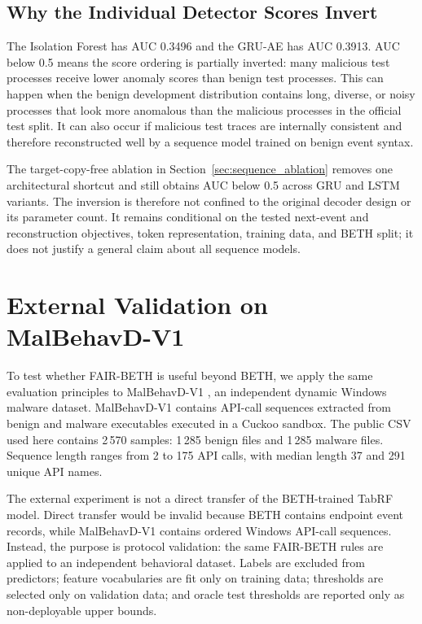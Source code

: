 \documentclass[10pt,journal,compsoc]{IEEEtran}
\begin{document}
\subsection{Why the Individual Detector Scores Invert}

The Isolation Forest has AUC 0.3496 and the GRU-AE has AUC 0.3913. AUC below 0.5 means the score ordering is partially inverted: many malicious test processes receive lower anomaly scores than benign test processes. This can happen when the benign development distribution contains long, diverse, or noisy processes that look more anomalous than the malicious processes in the official test split. It can also occur if malicious test traces are internally consistent and therefore reconstructed well by a sequence model trained on benign event syntax.

The target-copy-free ablation in Section~\ref{sec:sequence_ablation} removes one architectural shortcut and still obtains AUC below 0.5 across GRU and LSTM variants. The inversion is therefore not confined to the original decoder design or its parameter count. It remains conditional on the tested next-event and reconstruction objectives, token representation, training data, and BETH split; it does not justify a general claim about all sequence models.

\section{External Validation on MalBehavD-V1}
\label{sec:external_malbehavd}

To test whether FAIR-BETH is useful beyond BETH, we apply the same evaluation principles to MalBehavD-V1 \cite{maniriho2023,malbehavd2023}, an independent dynamic Windows malware dataset. MalBehavD-V1 contains API-call sequences extracted from benign and malware executables executed in a Cuckoo sandbox. The public CSV used here contains 2\,570 samples: 1\,285 benign files and 1\,285 malware files. Sequence length ranges from 2 to 175 API calls, with median length 37 and 291 unique API names.

The external experiment is not a direct transfer of the BETH-trained TabRF model. Direct transfer would be invalid because BETH contains endpoint event records, while MalBehavD-V1 contains ordered Windows API-call sequences. Instead, the purpose is protocol validation: the same FAIR-BETH rules are applied to an independent behavioral dataset. Labels are excluded from predictors; feature vocabularies are fit only on training data; thresholds are selected only on validation data; and oracle test thresholds are reported only as non-deployable upper bounds.
\end{document}
